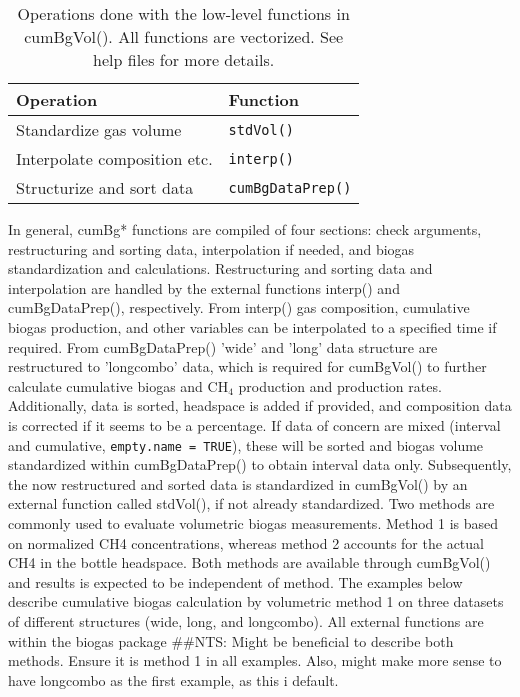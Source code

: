 \documentclass{article}
\begin{document}
\begin{table}[h!]
  \begin{center}
  \caption{Operations done with the low-level functions in cumBgVol(). All functions are vectorized. See help files for more details.}
  \label{tab:lowfunctionsummary}
  \vspace{3pt}
  
  \begin{tabular}{ll}
    \hline
    Operation                                    &   Function \\
    \hline
    Standardize gas volume                       &   \texttt{stdVol()} \\
    Interpolate composition etc.                 &   \texttt{interp()} \\
    Structurize and sort data                    &   \texttt{cumBgDataPrep()} \\   
		\hline
  \end{tabular}
  \end{center}
\end{table}

In general, cumBg* functions are compiled of four sections: check arguments, restructuring and sorting data, interpolation if needed, and biogas standardization and calculations. Restructuring and sorting data and interpolation are handled by the external functions interp() and cumBgDataPrep(), respectively. From interp() gas composition, cumulative biogas production, and other variables can be interpolated to a specified time if required. From cumBgDataPrep() 'wide' and 'long' data structure are restructured to 'longcombo' data, which is required for cumBgVol() to further calculate cumulative biogas and CH$_4$ production and production rates. Additionally, data is sorted, headspace is added if provided, and composition data is corrected if it seems to be a percentage. If data of concern are mixed (interval and cumulative, \texttt{empty.name = TRUE}), these will be sorted and biogas volume standardized within cumBgDataPrep() to obtain interval data only. Subsequently, the now restructured and sorted data is standardized in cumBgVol() by an external function called stdVol(), if not already standardized. 
Two methods are commonly used to evaluate volumetric biogas measurements. Method 1 is based on normalized CH4 concentrations, whereas method 2 accounts for the actual CH4 in the bottle headspace. Both methods are available through cumBgVol() and results is expected to be independent of method. The examples below describe cumulative biogas calculation by volumetric method 1 on three datasets of different structures (wide, long, and longcombo). 
All external functions are within the biogas package
##NTS: Might be beneficial to describe both methods. Ensure it is method 1 in all examples. Also, might make more sense to have longcombo as the first example, as this i default.
\end{document}
